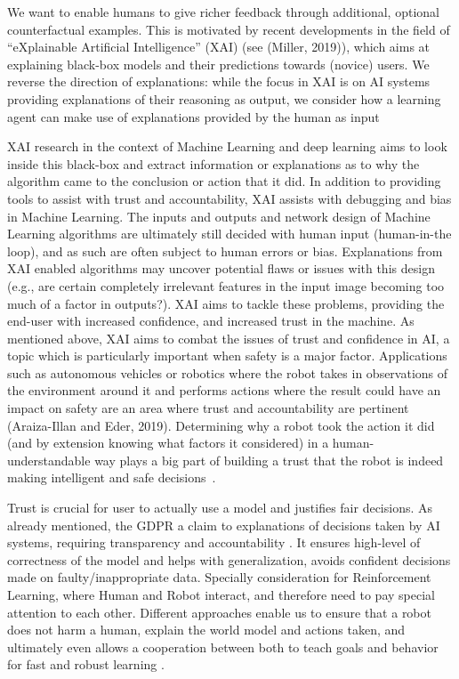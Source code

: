 \documentclass[twoside,11pt]{article}
\begin{document}
We want to enable humans to give richer feedback through additional, optional counterfactual examples. This is motivated by recent developments in the field of “eXplainable Artificial Intelligence” (XAI) (see (Miller, 2019)), which aims at explaining black-box models and their predictions towards (novice) users. We reverse the direction of explanations: while the focus in XAI is on AI systems providing explanations of their reasoning as output, we consider how a learning agent can make use of explanations provided by the human as input~\cite{Karalus:2021:HITL-counterfactuals}

XAI research in the context of Machine Learning and
deep learning aims to look inside this black-box and extract
information or explanations as to why the algorithm came to the
conclusion or action that it did. In addition to providing tools to
assist with trust and accountability, XAI assists with debugging
and bias in Machine Learning. The inputs and outputs and
network design of Machine Learning algorithms are ultimately
still decided with human input (human-in-the loop), and as such
are often subject to human errors or bias. Explanations from
XAI enabled algorithms may uncover potential flaws or issues
with this design (e.g., are certain completely irrelevant features
in the input image becoming too much of a factor in outputs?).
XAI aims to tackle these problems, providing the end-user
with increased confidence, and increased trust in the machine. As mentioned above, XAI aims to combat the issues of trust
and confidence in AI, a topic which is particularly important
when safety is a major factor. Applications such as autonomous
vehicles or robotics where the robot takes in observations of
the environment around it and performs actions where the
result could have an impact on safety are an area where trust
and accountability are pertinent (Araiza-Illan and Eder, 2019).
Determining why a robot took the action it did (and by extension
knowing what factors it considered) in a human-understandable
way plays a big part of building a trust that the robot is indeed
making intelligent and safe decisions~\cite{wells2021explainable}.

Trust is crucial for user to actually use a model and justifies fair decisions. As already mentioned, the GDPR \cite{Schneeberger:2020:legalAI} a claim to explanations of decisions taken by AI systems, requiring transparency and accountability \cite{Stoeger:2021:MedicalAI}. It ensures high-level of correctness of the model and helps with generalization, avoids confident decisions made on faulty/inappropriate data. Specially consideration for Reinforcement Learning, where Human and Robot interact, and therefore need to pay special attention to each other. Different approaches enable us to ensure that a robot does not harm a human, explain the world model and actions taken, and ultimately even allows a cooperation between both to teach goals and behavior for fast and robust learning \cite{PuiuttaVeith:2020:xAIRLSurvey}.
\end{document}
